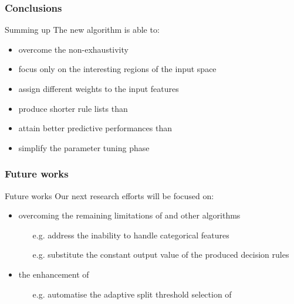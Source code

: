\documentclass[presentation]{beamer}
\begin{document}
\begin{frame}%
\frametitle{Conclusions}

\begin{block}{Summing up}
	The new \gridex algorithm is able to:
    \begin{itemize}
        \item overcome the \iter non-exhaustivity
        \item focus only on the interesting regions of the input space
        \item assign different weights to the input features
        \item produce shorter rule lists than \iter
        \item attain better predictive performances than \iter
        \item simplify the parameter tuning phase
    \end{itemize}
\end{block}

\end{frame}

\begin{frame}
	\frametitle{Future works}

\begin{exampleblock}{Future works}
	Our next research efforts will be focused on:
	\begin{itemize}
		\item overcoming the remaining limitations of \iter and other algorithms
		\begin{itemize}
			\item[e.g.] address the inability to handle categorical features
			\item[e.g.] substitute the constant output value of the produced decision rules
		\end{itemize}	
		\item the enhancement of \gridex
	    \begin{itemize}
			\item[e.g.] automatise the adaptive split threshold selection of \gridex
		\end{itemize}		
	\end{itemize}
\end{exampleblock}

\end{frame}
\end{document}
